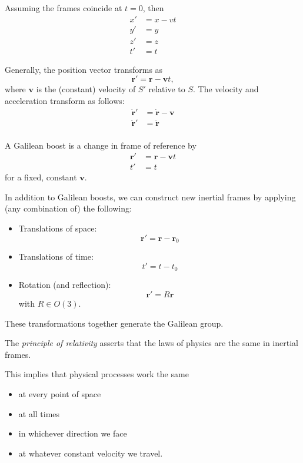 \documentclass[a4paper]{article}
\begin{document}
Assuming the frames coincide at $t = 0$, then
\begin{align*}
  x' &= x - vt\\
  y' &= y\\
  z' &= z\\
  t' &= t
\end{align*}

Generally, the position vector transforms as
\[
  \mathbf{r}' = \mathbf{r} - \mathbf{v}t,
\]
where $\mathbf{v}$ is the (constant) velocity of $S'$ relative to $S$. The velocity and acceleration transform as follows:
\begin{align*}
  \dot{\mathbf{r}}' &= \dot{\mathbf{r}} - \mathbf{v}\\
  \ddot{\mathbf{r}}' &= \ddot{\mathbf{r}}\\
\end{align*}

\begin{defi}
  A Galilean boost is a change in frame of reference by
  \begin{align*}
    \mathbf{r}' &= \mathbf{r} - \mathbf{v}t\\
    t' &= t
  \end{align*}
  for a fixed, constant $\mathbf{v}$.
\end{defi}

In addition to Galilean boosts, we can construct new inertial frames by applying (any combination of) the following:
\begin{itemize}
  \item Translations of space:
    \[
      \mathbf{r}' = \mathbf{r} - \mathbf{r}_0
    \]
  \item Translations of time:
    \[
      t' = t - t_0
    \]
  \item Rotation (and reflection):
    \[
      \mathbf{r}' = R\mathbf{r}
    \]
    with $R\in O(3)$.
\end{itemize}
These transformations together generate the Galilean group.

\begin{law}
  The \emph{principle of relativity} asserts that the laws of physics are the same in inertial frames.
\end{law}

This implies that physical processes work the same
\begin{itemize}
  \item at every point of space
  \item at all times
  \item in whichever direction we face
  \item at whatever constant velocity we travel.
\end{itemize}
\end{document}
